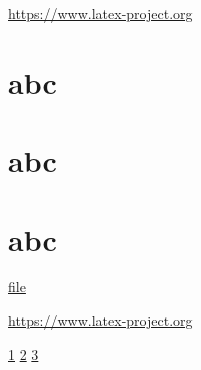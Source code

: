 \documentclass{article}
\begin{document}
\url{https://www.latex-project.org}

\section{abc}\label{sec}

\section{abc}\label{sec2}

\section{abc}\label{sec3}

\href{example-image.pdf}{file}

\newpage

\url{https://www.latex-project.org}


\ref{sec} \quad  \ref{sec2} \quad \ref{sec3}
\newpage

\end{document}
